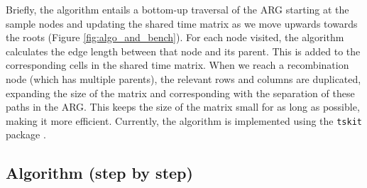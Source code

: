 Briefly, the algorithm entails a bottom-up traversal of the ARG starting at the sample nodes and updating the shared time matrix as we move upwards towards the roots (Figure \ref{fig:algo_and_bench}). For each node visited, the algorithm calculates the edge length between that node and its parent. This is added to the corresponding cells in the shared time matrix. When we reach a recombination node (which has multiple parents), the relevant rows and columns are duplicated, expanding the size of the matrix and corresponding with the separation of these paths in the ARG. This keeps the size of the matrix small for as long as possible, making it more efficient. Currently, the algorithm is implemented using the {\tt tskit} package \citep{Kelleher2018}.


\subsection{Algorithm (step by step)}
\label{appendixC}

